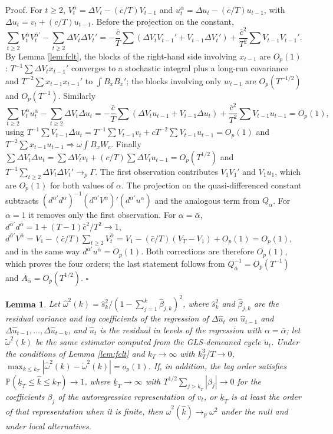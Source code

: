 \documentclass[12pt,a4paper]{article}
\newtheorem{lem}{Lemma}
\theoremstyle{definition}
\theoremstyle{definition}\newtheorem{example}{Example}
\theoremstyle{definition}\newtheorem{definition}{Definition}
\begin{document}
\noindent Proof. For $t\geq2$, $V^{\bar\alpha}_t=\Delta V_t-(\bar c/T)V_{t-1}$ and $u^{\bar\alpha}_t=\Delta u_t-(\bar c/T)u_{t-1}$, with $\Delta u_t=v_t+(c/T)u_{t-1}$. Before the projection on the constant,
\[
\textstyle\sum_{t\geq2}V^{\bar\alpha}_tV^{\bar\alpha\prime}_t-\sum_{t\geq2}\Delta V_t\Delta V_t'=-\frac{\bar c}{T}\sum(\Delta V_tV_{t-1}'+V_{t-1}\Delta V_t')+\frac{\bar c^2}{T^2}\sum V_{t-1}V_{t-1}'.
\]
By Lemma \ref{lem:fclt}, the blocks of the right-hand side involving $x_{t-1}$ are $O_p(1)$: $T^{-1}\sum\Delta V_tx_{t-1}'$ converges to a stochastic integral plus a long-run covariance and $T^{-2}\sum x_{t-1}x_{t-1}'$ to $\int B_xB_x'$; the blocks involving only $w_{t-1}$ are $O_p(T^{-1/2})$ and $O_p(T^{-1})$. Similarly
\[
\textstyle\sum_{t\geq2}V^{\bar\alpha}_tu^{\bar\alpha}_t-\sum_{t\geq2}\Delta V_t\Delta u_t=-\frac{\bar c}{T}\sum(\Delta V_tu_{t-1}+V_{t-1}\Delta u_t)+\frac{\bar c^2}{T^2}\sum V_{t-1}u_{t-1}=O_p(1),
\]
using $T^{-1}\sum V_{t-1}\Delta u_t=T^{-1}\sum V_{t-1}v_t+cT^{-2}\sum V_{t-1}u_{t-1}=O_p(1)$ and $T^{-2}\sum x_{t-1}u_{t-1}\Rightarrow\omega\int B_xW_c$. Finally $\sum\Delta V_t\Delta u_t=\sum\Delta V_tv_t+(c/T)\sum\Delta V_tu_{t-1}=O_p(T^{1/2})$ and $T^{-1}\sum_{t\geq2}\Delta V_t\Delta V_t'\to_p\Gamma$. The first observation contributes $V_1V_1'$ and $V_1u_1$, which are $O_p(1)$ for both values of $\alpha$. The projection on the quasi-differenced constant subtracts $(d^{\alpha\prime}d^\alpha)^{-1}(d^{\alpha\prime}V^\alpha)'(d^{\alpha\prime}u^\alpha)$ and the analogous term from $Q_\alpha$. For $\alpha=1$ it removes only the first observation. For $\alpha=\bar\alpha$, $d^{\bar\alpha\prime}d^{\bar\alpha}=1+(T-1)\bar c^2/T^2\to1$, $d^{\bar\alpha\prime}V^{\bar\alpha}=V_1-(\bar c/T)\sum_{t\geq2}V^{\bar\alpha}_t=V_1-(\bar c/T)(V_T-V_1)+O_p(1)=O_p(1)$, and in the same way $d^{\bar\alpha\prime}u^{\bar\alpha}=O_p(1)$. Both corrections are therefore $O_p(1)$, which proves the four orders; the last statement follows from $Q_{\bar\alpha}^{-1}=O_p(T^{-1})$ and $A_{\bar\alpha}=O_p(T^{1/2})$. $\square$

\begin{lem}\label{lem:lrv}
Let $\hat\omega^2(k)=\hat s^2_k/(1-\sum_{j=1}^k\hat\beta_{j,k})^2$, where $\hat s^2_k$ and $\hat\beta_{j,k}$ are the residual variance and lag coefficients of the regression of $\Delta\hat u_t$ on $\hat u_{t-1}$ and $\Delta\hat u_{t-1},\dots,\Delta\hat u_{t-k}$, and $\hat u_t$ is the residual in levels of the regression with $\alpha=\bar\alpha$; let $\tilde\omega^2(k)$ be the same estimator computed from the GLS-demeaned cycle $\tilde u_t$. Under the conditions of Lemma \ref{lem:fclt} and $k_T\to\infty$ with $k_T^3/T\to0$, $\max_{k\leq k_T}|\hat\omega^2(k)-\tilde\omega^2(k)|=o_p(1)$. If, in addition, the lag order satisfies $\mathbb P(\underline k_T\leq\hat k\leq k_T)\to1$, where $\underline k_T\to\infty$ with $T^{1/2}\sum_{j>\underline k_T}|\beta_j|\to0$ for the coefficients $\beta_j$ of the autoregressive representation of $v_t$, or $\underline k_T$ is at least the order of that representation when it is finite, then $\hat\omega^2(\hat k)\to_p\omega^2$ under the null and under local alternatives.
\end{lem}
\end{document}
